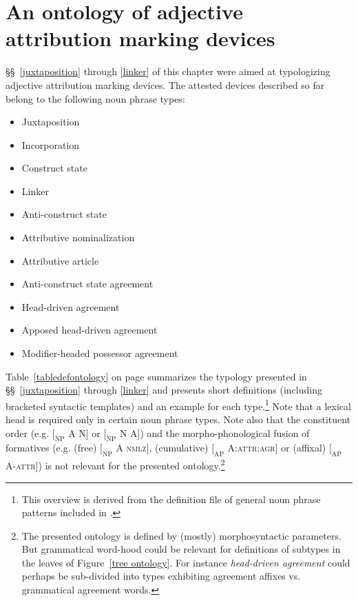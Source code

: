 \section[Ontology of attribution marking]{An ontology of adjective attribution marking devices}\label{ontol}
\S\S~\ref{juxtaposition} through \ref{linker} of this chapter were aimed at typologizing adjective attribution marking devices. The attested devices described so far belong to the following noun phrase types:
\begin{itemize}
\item{Juxtaposition}
\item{Incorporation}
\item{Construct state}
\item{Linker}
\item{Anti\hyp{}construct state}
\item{Attributive nominalization}
\item{Attributive article}
\item{Anti\hyp{}construct state agreement}
\item{Head\hyp{}driven agreement}
\item{Apposed head\hyp{}driven agreement}
\item{Modifier\hyp{}headed possessor agreement}
\end{itemize}
Table~\ref{tabledefontology} on page \pageref{tabledefontology} summarizes the typology presented in \S\S~\ref{juxtaposition} through \ref{linker} and presents short definitions (including bracketed syntactic templates) and an example for each type.\footnote{This overview is derived from the definition file of general noun phrase patterns included in \citet{AUTOTYP-NP}.} Note that a lexical head is required only in certain noun phrase types. Note also that the constituent order (e.g. $[_\textrm{NP}$ A N$]$ or $[_\textrm{NP}$ N A$]$) and the morpho-phonological fusion of formatives (e.g. (free) $[_\textrm{NP}$ A \textsc{nmlz}$]$, (cumulative) $[_\textrm{AP}$ A:\textsc{attr:agr}$]$ or (affixal) $[_\textrm{AP}$ A-\textsc{attr}$]$) is not relevant for the presented ontology.\footnote{The presented ontology is defined by (mostly) morphosyntactic parameters. But grammatical word-hood could be relevant for definitions of subtypes in the leaves of Figure~\ref{tree ontology}. For instance \textit{head\hyp{}driven agreement} could perhaps be sub-divided into types exhibiting agreement affixes vs. grammatical agreement words.}

